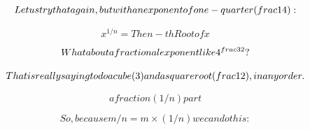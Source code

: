 






\[Let us try that again, but with an exponent of one-quarter (\\frac{1}{4}):\]

\[x^{1/n} = The n-th Root of x\]

\[What about a fractional exponent like 4^{\\frac{3}{2}} ?\]

\[That is really saying to do a cube (3) and a square root (\\frac{1}{2}), in any order.\]

\[a fraction (1/n) part\]

\[So, because m/n = m \times (1/n) we can do this:\]

